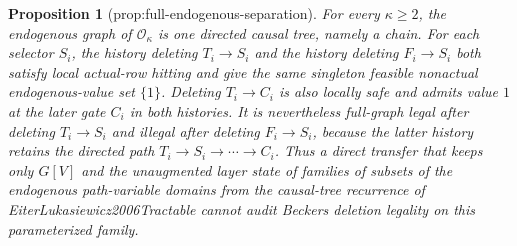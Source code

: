 \documentclass{article}
\newtheorem{proposition}{Proposition}
\begin{document}
\begin{proposition}[prop:full-endogenous-separation]\label{prop:full-endogenous-separation}
For every \(\kappa\ge2\), the endogenous graph of \(\mathcal O_{\kappa}\) is one directed causal tree, namely a chain. For each selector \(S_i\), the history deleting \(T_i\to S_i\) and the history deleting \(F_i\to S_i\) both satisfy local actual-row hitting and give the same singleton feasible nonactual endogenous-value set \(\{1\}\). Deleting \(T_i\to C_i\) is also locally safe and admits value \(1\) at the later gate \(C_i\) in both histories. It is nevertheless full-graph legal after deleting \(T_i\to S_i\) and illegal after deleting \(F_i\to S_i\), because the latter history retains the directed path \(T_i\to S_i\to\cdots\to C_i\). Thus a direct transfer that keeps only \(G[V]\) and the unaugmented layer state of families of subsets of the endogenous path-variable domains from the causal-tree recurrence of EiterLukasiewicz2006Tractable cannot audit Beckers deletion legality on this parameterized family.
\end{proposition}
\end{document}
